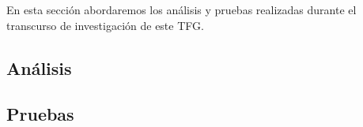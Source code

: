 \documentclass[../main.tex]{subfiles}
\begin{document}
En esta sección abordaremos los análisis y pruebas realizadas durante el transcurso de investigación de este TFG.

\subsection{Análisis}

\subsection{Pruebas}
\end{document}
